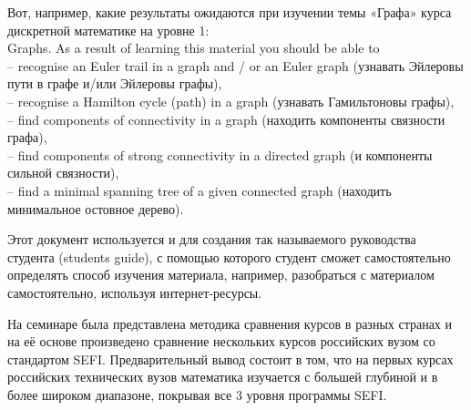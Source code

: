\documentclass[intlimits,twoside,a4paper,11pt]{article}
\begin{document}
Вот, например, какие результаты ожидаются при изучении темы «Графа» курса дискретной математике на уровне 1:\\
Graphs.
As a result of learning this material you should be able to\\
-- recognise an Euler trail in a graph and / or an Euler graph (узнавать Эйлеровы пути в графе и/или Эйлеровы графы),\\
-- recognise a Hamilton cycle (path) in a graph (узнавать Гамильтоновы графы),\\
-- find components of connectivity in a graph (находить компоненты связности графа),\\
-- find components of strong connectivity in a directed graph (и компоненты сильной связности),\\
-- find a minimal spanning tree of a given connected graph (находить минимальное остовное дерево).

Этот документ используется и для создания так называемого руководства студента (students guide), с помощью которого студент сможет самостоятельно определять способ изучения материала, например, разобраться с материалом самостоятельно, используя интернет-ресурсы.

На семинаре была представлена методика сравнения курсов в разных странах и на её основе произведено сравнение нескольких курсов российских вузом со стандартом SEFI. Предварительный вывод состоит в том, что на первых курсах российских технических вузов математика изучается с большей глубиной и в более широком диапазоне, покрывая все 3 уровня программы SEFI.
\end{document}
